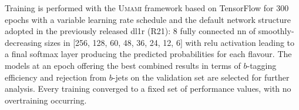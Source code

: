 
Training is performed with the \textsc{Umami} framework \cite{UmamiCite} based on TensorFlow \cite{tensorflow2015-whitepaper} for 300 epochs with a variable learning rate schedule and the default network structure adopted in the previously released \gls{dl1r} (R21): 8 fully connected \gls{nn} of smoothly-decreasing sizes in [256, 128, 60, 48, 36, 24, 12, 6] with \gls{relu} activation leading to a final softmax layer producing the predicted probabilities for each flavour. The models at an epoch offering the best combined results in terms of $b$-tagging efficiency and rejection from $b$-jets on the validation set are selected for further analysis. Every training converged to a fixed set of performance values, with no overtraining occurring.\\

